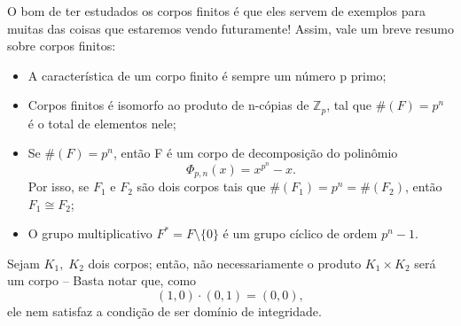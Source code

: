 \documentclass[../algebraIII_notes.tex]{subfiles}
\begin{document}
O bom de ter estudados os corpos finitos é que eles servem de exemplos para muitas das coisas que estaremos vendo futuramente! Assim, vale um breve resumo sobre corpos finitos:
\begin{itemize}
	\item[1)] A característica de um corpo finito é sempre um número p primo;
	\item[2)] Corpos finitos é isomorfo ao produto de n-cópias de \(\mathbb{Z}_{p}\), tal que \(\#(F) = p^{n}\) é o total de elementos nele;
	\item[3)] Se \(\#(F) = p^{n}\), então F é um corpo de decomposição do polinômio
	      \[
		      \Phi_{p, n}(x) = x^{p^{n}}-x.
	      \]
	      Por isso, se \(F_1\) e \(F_2\) são dois corpos tais que \(\#(F_1) = p^{n} = \#(F_2)\), então \(F_1\cong F_2\);
	\item[4)] O grupo multiplicativo \(F^{*} = F\setminus{\{0\}}\) é um grupo cíclico de ordem \(p^{n}-1\).
\end{itemize}
\begin{tcolorbox}[
		skin=enhanced,
		title=Observação,
		fonttitle=\bfseries,
		colframe=black,
		colbacktitle=cyan!75!white,
		colback=cyan!15,
		colbacklower=black,
		coltitle=black,
		drop fuzzy shadow,
	]
	Sejam \(K_1,\; K_2\) dois corpos; então, não necessariamente o produto \(K_1 \times K_2\) será um corpo -- Basta notar que, como
	\[
		(1, 0)\cdot (0, 1) = (0, 0),
	\]
	ele nem satisfaz a condição de ser domínio de integridade.
\end{tcolorbox}
\end{document}
